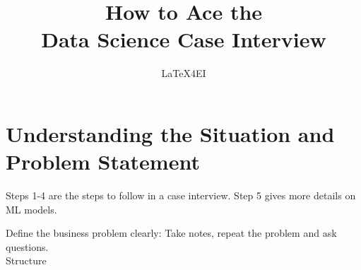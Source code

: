 \documentclass[english]{latex4ei/latex4ei_sheet}
\title{How to Ace the \\ Data Science Case Interview }
\author{LaTeX4EI}					%
\begin{document}
\ifdefined\GitRevision{}\fi

\maketitle   %


\section{Understanding the Situation and Problem Statement}
\begin{sectionbox}
\begin{emphbox}
Steps 1-4 are the steps to follow in a case interview. Step 5 gives more details on ML models.
\end{emphbox}
    Define the business problem clearly: Take notes, repeat the problem and ask questions.\\
    Structure 
\end{sectionbox}
\end{document}
